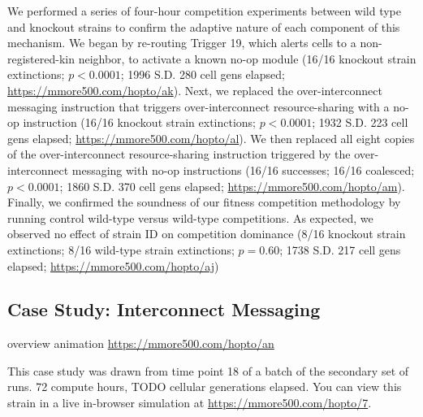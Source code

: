 We performed a series of four-hour competition experiments between wild type and knockout strains to confirm the adaptive nature of each component of this mechanism.
We began by re-routing Trigger 19, which alerts cells to a non-registered-kin neighbor, to activate a known no-op module (16/16 knockout strain extinctions; $p < 0.0001$; 1996 S.D. 280 cell gens elapsed; \url{https://mmore500.com/hopto/ak}).
Next, we replaced the over-interconnect messaging instruction that triggers over-interconnect resource-sharing with a no-op instruction (16/16 knockout strain extinctions; $p < 0.0001$; 1932 S.D. 223 cell gens elapsed; \url{https://mmore500.com/hopto/al}).
We then replaced all eight copies of the over-interconnect resource-sharing instruction triggered by the over-interconnect messaging with no-op instructions (16/16 successes; 16/16 coalesced; $p < 0.0001$; 1860 S.D. 370 cell gens elapsed; \url{https://mmore500.com/hopto/am}).
Finally, we confirmed the soundness of our fitness competition methodology by running control wild-type versus wild-type competitions.
As expected, we observed no effect of strain ID on competition dominance (8/16 knockout strain extinctions; 8/16 wild-type strain extinctions; $p = 0.60$; 1738 S.D. 217 cell gens elapsed; \url{https://mmore500.com/hopto/aj})

\subsection{Case Study: Interconnect Messaging}



overview animation \url{https://mmore500.com/hopto/an}

This case study was drawn from time point 18 of a batch of the secondary set of runs.
72 compute hours, TODO cellular generations elapsed.
You can view this strain in a live in-browser simulation at \url{https://mmore500.com/hopto/7}.

